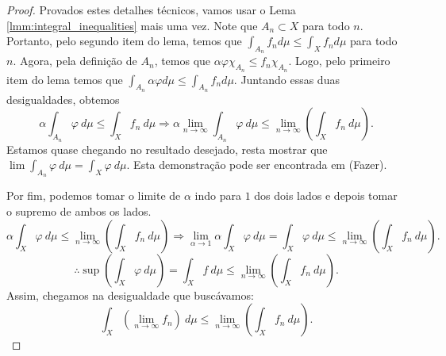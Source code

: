 \begin{proof}
    Provados estes detalhes técnicos, vamos usar o Lema \ref{lmm:integral_inequalities} mais uma vez. Note que $A_n\subset X$ para todo $n$. Portanto, pelo segundo item do lema, temos que $\int_{A_n} f_n d\mu \leq \int_{X} f_n d\mu$ para todo $n$. Agora, pela definição de $A_n$, temos que $\alpha\varphi\chi_{A_n} \leq f_n\chi_{A_n}$. Logo, pelo primeiro item do lema temos que $\int_{A_n} \alpha\varphi d\mu \leq \int_{A_n} f_n d\mu$. Juntando essas duas desigualdades, obtemos
    \begin{equation*}
        \alpha \int_{A_n} \varphi \ d\mu \leq \int_{X} f_n \ d\mu \Rightarrow \alpha \lim_{n\rightarrow \infty} \int_{A_n} \varphi \ d\mu \leq \lim_{n\rightarrow \infty}\left(\int_{X} f_n \ d\mu\right).
    \end{equation*}
    Estamos quase chegando no resultado desejado, resta mostrar que $\lim\int_{A_n} \varphi \ d\mu = \int_{X} \varphi \ d\mu$. Esta demonstração pode ser encontrada em (Fazer).

    Por fim, podemos tomar o limite de $\alpha$ indo para $1$ dos dois lados e depois tomar o supremo de ambos os lados.
    \begin{equation*}
        \alpha \int_{X} \varphi \ d\mu \leq \lim_{n\rightarrow \infty}\left(\int_{X} f_n \ d\mu\right)\Rightarrow \lim_{\alpha\rightarrow 1} \alpha \int_{X} \varphi \ d\mu = \int_{X} \varphi \ d\mu \leq \lim_{n\rightarrow \infty}\left(\int_{X} f_n \ d\mu\right).
    \end{equation*}
    \begin{equation*}
        \therefore \sup\left(\int_{X} \varphi \ d\mu \right) = \int_{X} f \ d\mu \leq \lim_{n\rightarrow \infty}\left(\int_{X} f_n \ d\mu\right).
    \end{equation*}
    Assim, chegamos na desigualdade que buscávamos:
    \begin{equation*}
        \int_{X} \left(\lim_{n\rightarrow \infty} f_n\right) \ d\mu \leq \lim_{n\rightarrow \infty} \left( 
 \int_{X} f_n \ d\mu\right).
    \end{equation*}
\end{proof}